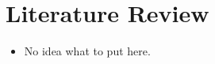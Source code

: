\section{Literature Review}\label{literature-review}

\begin{itemize}
\tightlist
\item
  No idea what to put here.
\end{itemize}
